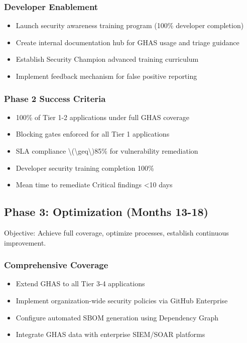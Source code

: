 \documentclass[11pt]{article}
\begin{document}
\subsubsection{Developer Enablement}

\begin{itemize}[leftmargin=*]
\item Launch security awareness training program (100\% developer completion)
\item Create internal documentation hub for GHAS usage and triage guidance
\item Establish Security Champion advanced training curriculum
\item Implement feedback mechanism for false positive reporting
\end{itemize}
\subsubsection{Phase 2 Success Criteria}

\begin{itemize}[leftmargin=*]
\item 100\% of Tier 1-2 applications under full GHAS coverage
\item Blocking gates enforced for all Tier 1 applications
\item SLA compliance \textbackslash{}(\textbackslash{}geq\textbackslash{})85\% for vulnerability remediation
\item Developer security training completion 100\%
\item Mean time to remediate Critical findings \textless{}10 days
\end{itemize}
\subsection{Phase 3: Optimization (Months 13-18)}

Objective: Achieve full coverage, optimize processes, establish continuous improvement.

\subsubsection{Comprehensive Coverage}

\begin{itemize}[leftmargin=*]
\item Extend GHAS to all Tier 3-4 applications
\item Implement organization-wide security policies via GitHub Enterprise
\item Configure automated SBOM generation using Dependency Graph
\item Integrate GHAS data with enterprise SIEM/SOAR platforms
\end{itemize}
\end{document}
